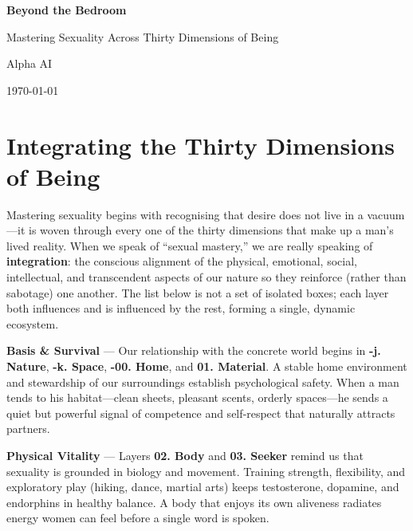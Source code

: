 \documentclass[12pt]{book}
\begin{document}
\begin{titlepage}
    \centering
    {\Huge\bfseries Beyond the Bedroom\par}
    \vspace{1.4cm}
    {\large Mastering Sexuality Across Thirty Dimensions of Being\par}
    \vfill
    {\large Alpha AI\par}
    \vspace{0.5cm}
    {\large \today\par}
\end{titlepage}

\tableofcontents

\section*{Integrating the Thirty Dimensions of Being}

Mastering sexuality begins with recognising that desire does not live in a vacuum—it is woven through every one of the thirty dimensions that make up a man’s lived reality.  When we speak of “sexual mastery,” we are really speaking of \textbf{integration}: the conscious alignment of the physical, emotional, social, intellectual, and transcendent aspects of our nature so they reinforce (rather than sabotage) one another.  The list below is not a set of isolated boxes; each layer both influences and is influenced by the rest, forming a single, dynamic ecosystem.

\bigskip
\textbf{Basis \& Survival} — Our relationship with the concrete world begins in \textbf{-j. Nature}, \textbf{-k. Space}, \textbf{-00. Home}, and \textbf{01. Material}.  A stable home environment and stewardship of our surroundings establish psychological safety.  When a man tends to his habitat—clean sheets, pleasant scents, orderly spaces—he sends a quiet but powerful signal of competence and self‑respect that naturally attracts partners.

\bigskip
\textbf{Physical Vitality} — Layers \textbf{02. Body} and \textbf{03. Seeker} remind us that sexuality is grounded in biology and movement.  Training strength, flexibility, and exploratory play (hiking, dance, martial arts) keeps testosterone, dopamine, and endorphins in healthy balance.  A body that enjoys its own aliveness radiates energy women can feel before a single word is spoken.
\end{document}
